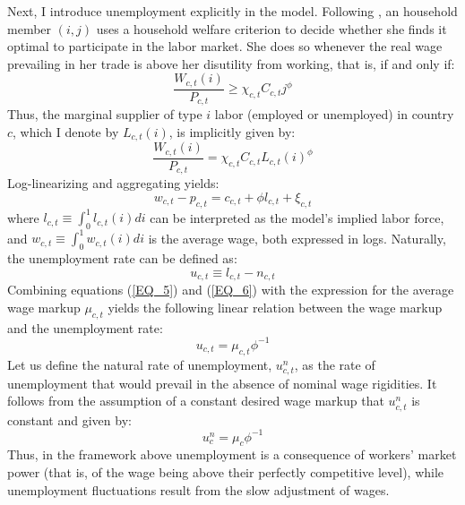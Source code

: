 \documentclass[12pt]{article}
\begin{document}
\begin{appendices}
Next, I introduce unemployment explicitly in the model. Following \cite{Gali2011}, an household member $(i,j)$ uses a household welfare criterion to decide whether she finds it optimal to participate in the labor market. She does so whenever the real wage prevailing in her trade is above her disutility from working, that is, if and only if:
\begin{equation*}
    \dfrac{W_{c,t}(i)}{P_{c,t}} \geq \chi_{c,t} C_{c,t} j^{\phi}
\end{equation*}
Thus, the marginal supplier of type $i$ labor (employed or unemployed) in country $c$, which I denote by $L_{c,t}(i)$, is implicitly given by:
\begin{equation*}
    \dfrac{W_{c,t}(i)}{P_{c,t}} = \chi_{c,t} C_{c,t} L_{c,t}(i)^{\phi}
\end{equation*}
Log-linearizing and aggregating yields:
\begin{equation}
    \label{EQ_5}
    w_{c,t} - p_{c,t} = c_{c,t} + \phi l_{c,t} + \xi_{c,t}
\end{equation}
where $l_{c,t} \equiv \int_0^1 l_{c,t}(i) di$ can be interpreted as the model’s implied labor force, and $w_{c,t} \equiv \int_0^1 w_{c,t}(i) di$ is the average wage, both expressed in logs. Naturally, the unemployment rate can be defined as:
\begin{equation}
    \label{EQ_6}
    u_{c,t} \equiv l_{c,t} - n_{c,t}
\end{equation}
Combining equations (\ref{EQ_5}) and (\ref{EQ_6}) with the expression for the average wage markup $\mu_{c,t}$ yields the following linear relation between the wage markup and the unemployment rate:
\begin{equation}
    \label{EQ_u}
    u_{c,t} = \mu_{c,t} \phi^{-1} 
\end{equation}
Let us define the natural rate of unemployment, $u_{c,t}^n$, as the rate of unemployment that would prevail in the absence of nominal wage rigidities. It follows from the assumption of a constant desired wage markup that $u_{c,t}^n$ is constant and given by:
\begin{equation}
    \label{EQ_un}
    u_{c}^n = \mu_c \phi^{-1}
\end{equation}
Thus, in the framework above unemployment is a consequence of workers’ market power (that is, of the wage being above their perfectly competitive level), while unemployment fluctuations result from the slow adjustment of wages. 


\end{appendices}
\end{document}
